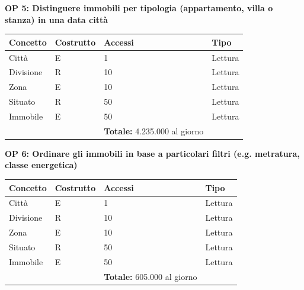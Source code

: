 \documentclass[a4paper,12pt]{report}
\begin{document}
            \textbf{OP 5: Distinguere immobili per tipologia (appartamento, villa o stanza) in una data città}
        	\begin{table}[H]
            \centering
             \begin{tabular}{llll}
             \rowcolor{yellow!20} \textbf{Concetto} & \textbf{Costrutto} & \textbf{Accessi} & \textbf{Tipo}\\ [0.5ex] 
             \hline
             Città & E & 1 & Lettura \\ 
             Divisione & R & 10 & Lettura \\ 
             Zona & E & 10 & Lettura \\ 
             Situato & R & 50 & Lettura \\ 
             Immobile & E & 50 & Lettura \\
             \hline
                \rowcolor{yellow!20} &   & \textbf{Totale:}  4.235.000 al giorno &  \\ [1ex] 
             
             \end{tabular}
            \end{table}

            \textbf{OP 6: Ordinare gli immobili in base a particolari filtri (e.g. metratura, classe energetica)}
        	\begin{table}[H]
            \centering
             \begin{tabular}{llll}
             \rowcolor{yellow!20} \textbf{Concetto} & \textbf{Costrutto} & \textbf{Accessi} & \textbf{Tipo}\\ [0.5ex] 
             \hline
             Città & E & 1 & Lettura \\ 
             Divisione & R & 10 & Lettura \\ 
             Zona & E & 10 & Lettura \\ 
             Situato & R & 50 & Lettura \\ 
             Immobile & E & 50 & Lettura \\
             \hline
                \rowcolor{yellow!20} &   & \textbf{Totale:}  605.000 al giorno &  \\ [1ex] 
             
             \end{tabular}
            \end{table}
\end{document}
